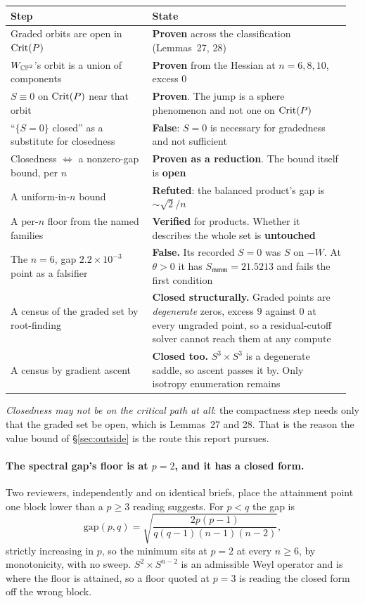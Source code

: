 \begin{center}
\begin{tabular}{@{}p{0.40\linewidth}p{0.56\linewidth}@{}}
\toprule
\textbf{Step} & \textbf{State} \\
\midrule
Graded orbits are open in $\mathrm{Crit}(P)$ & \textbf{Proven} across the classification (Lemmas~27, 28) \\
$W_{\mathbb{CP}^2}$'s orbit is a union of components & \textbf{Proven} from the Hessian at $n=6,8,10$, excess $0$ \\
$S\equiv0$ on $\mathrm{Crit}(P)$ near that orbit & \textbf{Proven}. The jump is a sphere phenomenon and not one on $\mathrm{Crit}(P)$ \\
``$\{S=0\}$ closed'' as a substitute for closedness & \textbf{False}: $S=0$ is necessary for gradedness and not sufficient \\
Closedness $\iff$ a nonzero-gap bound, per $n$ & \textbf{Proven as a reduction}. The bound itself is \textbf{open} \\
A uniform-in-$n$ bound & \textbf{Refuted}: the balanced product's gap is $\sim\sqrt2/n$ \\
A per-$n$ floor from the named families & \textbf{Verified} for products. Whether it describes the whole set is \textbf{untouched} \\
The $n=6$, gap $2.2\times10^{-3}$ point as a falsifier & \textbf{False.} Its recorded $S=0$ was $S$ on $-W$. At $\theta>0$ it has $S_{\mathfrak{mmm}}=21.5213$ and fails the first condition \\
A census of the graded set by root-finding & \textbf{Closed structurally.} Graded points are \emph{degenerate} zeros, excess $9$ against $0$ at every ungraded point, so a residual-cutoff solver cannot reach them at any compute \\
A census by gradient ascent & \textbf{Closed too.} $S^3\times S^3$ is a degenerate saddle, so ascent passes it by. Only isotropy enumeration remains \\
\bottomrule
\end{tabular}
\end{center}

\emph{Closedness may not be on the critical path at all}: the compactness step needs only that the graded set be open, which is Lemmas~27 and 28. That is the reason the value bound of \S\ref{sec:outside} is the route this report pursues.

\paragraph{The spectral gap's floor is at $p=2$, and it has a closed form.} Two reviewers, independently and on identical briefs, place the attainment point one block lower than a $p\ge3$ reading suggests. For $p<q$ the gap is
\[
\mathrm{gap}(p,q)=\sqrt{\frac{2p(p-1)}{q(q-1)(n-1)(n-2)}},
\]
strictly increasing in $p$, so the minimum sits at $p=2$ at every $n\ge6$, by monotonicity, with no sweep. $S^2\times S^{n-2}$ is an admissible Weyl operator and is where the floor is attained, so a floor quoted at $p=3$ is reading the closed form off the wrong block.

